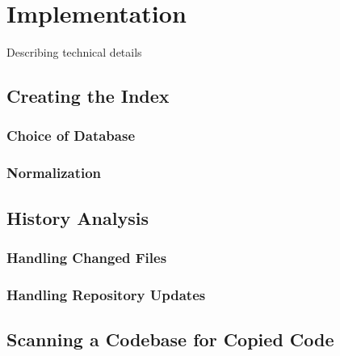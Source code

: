 
\chapter{Implementation}\label{chapter:implementation}
Describing technical details
\section{Creating the Index}
\subsection{Choice of Database}
\subsection{Normalization}
\section{History Analysis}
\subsection{Handling Changed Files}
\subsection{Handling Repository Updates}
\section{Scanning a Codebase for Copied Code}